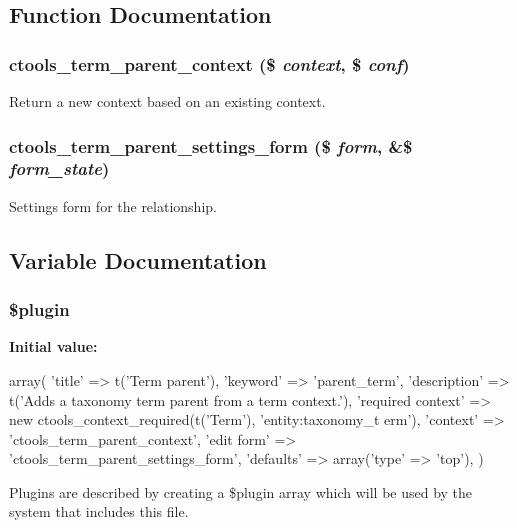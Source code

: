\subsection{Function Documentation}
\hypertarget{relationships_2term__parent_8inc_ab8a342117f0788bec94767974ec73484}{
\subsubsection[{ctools\_\-term\_\-parent\_\-context}]{\setlength{\rightskip}{0pt plus 5cm}ctools\_\-term\_\-parent\_\-context (\$ {\em context}, \/  \$ {\em conf})}}
\label{relationships_2term__parent_8inc_ab8a342117f0788bec94767974ec73484}
Return a new context based on an existing context. \hypertarget{relationships_2term__parent_8inc_a05b2f9f6619b4ced6b6176b7de6c2940}{
\subsubsection[{ctools\_\-term\_\-parent\_\-settings\_\-form}]{\setlength{\rightskip}{0pt plus 5cm}ctools\_\-term\_\-parent\_\-settings\_\-form (\$ {\em form}, \/  \&\$ {\em form\_\-state})}}
\label{relationships_2term__parent_8inc_a05b2f9f6619b4ced6b6176b7de6c2940}
Settings form for the relationship. 

\subsection{Variable Documentation}
\hypertarget{relationships_2term__parent_8inc_ada8a7130088351710bb02ed622d6bf65}{
\subsubsection[{\$plugin}]{\setlength{\rightskip}{0pt plus 5cm}\$plugin}}
\label{relationships_2term__parent_8inc_ada8a7130088351710bb02ed622d6bf65}
{\bfseries Initial value:}
\begin{DoxyCode}
 array(
  'title' => t('Term parent'),
  'keyword' => 'parent_term',
  'description' => t('Adds a taxonomy term parent from a term context.'),
  'required context' => new ctools_context_required(t('Term'), 'entity:taxonomy_t
      erm'),
  'context' => 'ctools_term_parent_context',
  'edit form' => 'ctools_term_parent_settings_form',
  'defaults' => array('type' => 'top'),
)
\end{DoxyCode}
Plugins are described by creating a \$plugin array which will be used by the system that includes this file. 